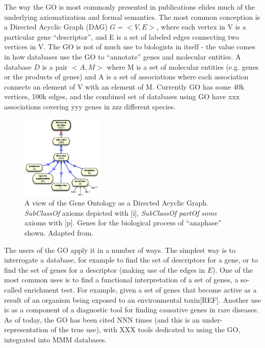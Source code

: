 \documentclass{llncs}
\begin{document}
The way the GO is most commonly presented in publications elides much
of the underlying axiomatization and formal semantics. The most common
conception is a Directed Acyclic Graph (DAG) $G = <V,E>$, where each
vertex in V is a particular gene ``descriptor'', and E is a set of
labeled edges connecting two vertices in V. The GO is not of much use
to biologists in itself - the value comes in how databases use the GO
to ``annotate'' genes and molecular entities.  A database $D$ is a
pair $<A, M>$ where M is a set of molecular entities (e.g. genes or
the products of genes) and A is a set of associations where each
association connects an element of V with an element of M. Currently
GO has some 40k vertices, 100k edges, and the combined set of databases
using GO have xxx associations covering yyy genes in zzz different
species\cite{Blake2013}.

\begin{figure}
\center
\includegraphics[height=4cm]{dag}
\caption{A view of the Gene Ontology as a Directed Acyclic
  Graph. \emph{SubClassOf} axioms depicted with [i], \emph{SubClassOf
    partOf some} axioms with [p]. Genes for the biological process of
  ``anaphase'' shown. Adapted from\cite{washington2008ontologies}. }
\end{figure}

The users of the GO apply it in a number of ways. The simplest way is
to interrogate a database, for example to find the set of descriptors
for a gene, or to find the set of genes for a descriptor (making use
of the edges in $E$). One of the most common uses is to find a
functional interpretation of a set of genes, a so-called enrichment
test. For example, given a set of genes that become active as a result
of an organism being exposed to an environmental toxin[REF]. Another
use is as a component of a diagnostic tool for finding causative genes
in rare diseases\cite{Phevor}. As of today, the GO has been cited NNN
times (and this is an under-representation of the true use), with XXX
tools dedicated to using the GO, integrated into MMM databases.
\end{document}
